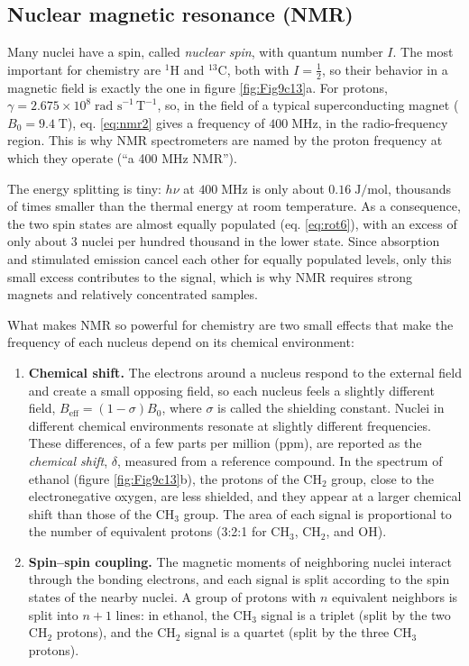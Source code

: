 \documentclass[
  english,
  9pt,
]{extbook}
\providecommand{\tightlist}{%
  \setlength{\itemsep}{0pt}\setlength{\parskip}{0pt}}
\theoremstyle{definition}
\theoremstyle{definition}
\theoremstyle{definition}
\theoremstyle{definition}
\theoremstyle{remark}
\begin{document}
\subsection{Nuclear magnetic resonance (NMR)}\label{nuclear-magnetic-resonance-nmr}

Many nuclei have a spin, called \emph{nuclear spin}, with quantum number \(I\). The most important for chemistry are \(^1\mathrm{H}\) and \(^{13}\mathrm{C}\), both with \(I=\frac{1}{2}\), so their behavior in a magnetic field is exactly the one in figure \ref{fig:Fig9c13}a. For protons, \(\gamma=2.675\times10^{8}\;\text{rad s}^{-1}\,\text{T}^{-1}\), so, in the field of a typical superconducting magnet (\(B_0=9.4\;\text{T}\)), eq. \eqref{eq:nmr2} gives a frequency of \(400\;\text{MHz}\), in the radio-frequency region. This is why NMR spectrometers are named by the proton frequency at which they operate (``a 400 MHz NMR'').

The energy splitting is tiny: \(h\nu\) at \(400\;\text{MHz}\) is only about \(0.16\;\text{J/mol}\), thousands of times smaller than the thermal energy at room temperature. As a consequence, the two spin states are almost equally populated (eq. \eqref{eq:rot6}), with an excess of only about 3 nuclei per hundred thousand in the lower state. Since absorption and stimulated emission cancel each other for equally populated levels, only this small excess contributes to the signal, which is why NMR requires strong magnets and relatively concentrated samples.

What makes NMR so powerful for chemistry are two small effects that make the frequency of each nucleus depend on its chemical environment:

\begin{enumerate}
\def\labelenumi{\arabic{enumi}.}
\tightlist
\item
  \textbf{Chemical shift.} The electrons around a nucleus respond to the external field and create a small opposing field, so each nucleus feels a slightly different field, \(B_\text{eff}=(1-\sigma)B_0\), where \(\sigma\) is called the shielding constant. Nuclei in different chemical environments resonate at slightly different frequencies. These differences, of a few parts per million (ppm), are reported as the \emph{chemical shift}, \(\delta\), measured from a reference compound. In the spectrum of ethanol (figure \ref{fig:Fig9c13}b), the protons of the \(\mathrm{CH_2}\) group, close to the electronegative oxygen, are less shielded, and they appear at a larger chemical shift than those of the \(\mathrm{CH_3}\) group. The area of each signal is proportional to the number of equivalent protons (3:2:1 for \(\mathrm{CH_3}\), \(\mathrm{CH_2}\), and \(\mathrm{OH}\)).
\item
  \textbf{Spin--spin coupling.} The magnetic moments of neighboring nuclei interact through the bonding electrons, and each signal is split according to the spin states of the nearby nuclei. A group of protons with \(n\) equivalent neighbors is split into \(n+1\) lines: in ethanol, the \(\mathrm{CH_3}\) signal is a triplet (split by the two \(\mathrm{CH_2}\) protons), and the \(\mathrm{CH_2}\) signal is a quartet (split by the three \(\mathrm{CH_3}\) protons).
\end{enumerate}
\end{document}
